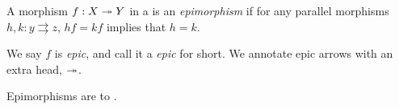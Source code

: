 


\begin{dfn*}[Epimorphism]
	A morphism $f: X\twoheadrightarrow Y$ in a  is an \emph{epimorphism} if
	for any parallel morphisms $h,k: y\rightrightarrows z$, $hf = kf$ implies that
	$h = k$.
\end{dfn*}

\begin{notation}
	We say $f$ is \emph{epic}, and call it a \emph{epic} for short. We annotate
	epic arrows with an extra head, $\twoheadrightarrow$.
\end{notation}

Epimorphisms are  to .


